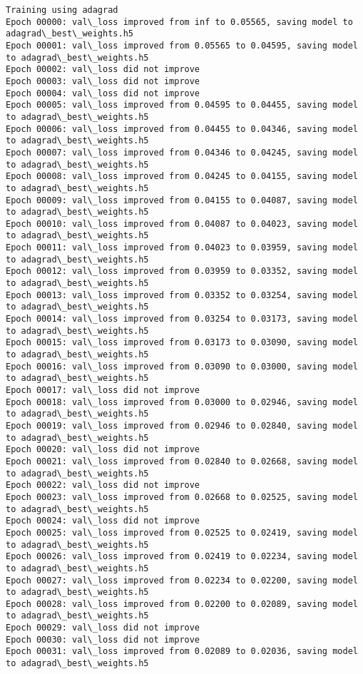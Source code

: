 \documentclass[11pt]{article}
\begin{document}
\begin{Verbatim}[commandchars=\\\{\}]
Training using adagrad
Epoch 00000: val\_loss improved from inf to 0.05565, saving model to adagrad\_best\_weights.h5
Epoch 00001: val\_loss improved from 0.05565 to 0.04595, saving model to adagrad\_best\_weights.h5
Epoch 00002: val\_loss did not improve
Epoch 00003: val\_loss did not improve
Epoch 00004: val\_loss did not improve
Epoch 00005: val\_loss improved from 0.04595 to 0.04455, saving model to adagrad\_best\_weights.h5
Epoch 00006: val\_loss improved from 0.04455 to 0.04346, saving model to adagrad\_best\_weights.h5
Epoch 00007: val\_loss improved from 0.04346 to 0.04245, saving model to adagrad\_best\_weights.h5
Epoch 00008: val\_loss improved from 0.04245 to 0.04155, saving model to adagrad\_best\_weights.h5
Epoch 00009: val\_loss improved from 0.04155 to 0.04087, saving model to adagrad\_best\_weights.h5
Epoch 00010: val\_loss improved from 0.04087 to 0.04023, saving model to adagrad\_best\_weights.h5
Epoch 00011: val\_loss improved from 0.04023 to 0.03959, saving model to adagrad\_best\_weights.h5
Epoch 00012: val\_loss improved from 0.03959 to 0.03352, saving model to adagrad\_best\_weights.h5
Epoch 00013: val\_loss improved from 0.03352 to 0.03254, saving model to adagrad\_best\_weights.h5
Epoch 00014: val\_loss improved from 0.03254 to 0.03173, saving model to adagrad\_best\_weights.h5
Epoch 00015: val\_loss improved from 0.03173 to 0.03090, saving model to adagrad\_best\_weights.h5
Epoch 00016: val\_loss improved from 0.03090 to 0.03000, saving model to adagrad\_best\_weights.h5
Epoch 00017: val\_loss did not improve
Epoch 00018: val\_loss improved from 0.03000 to 0.02946, saving model to adagrad\_best\_weights.h5
Epoch 00019: val\_loss improved from 0.02946 to 0.02840, saving model to adagrad\_best\_weights.h5
Epoch 00020: val\_loss did not improve
Epoch 00021: val\_loss improved from 0.02840 to 0.02668, saving model to adagrad\_best\_weights.h5
Epoch 00022: val\_loss did not improve
Epoch 00023: val\_loss improved from 0.02668 to 0.02525, saving model to adagrad\_best\_weights.h5
Epoch 00024: val\_loss did not improve
Epoch 00025: val\_loss improved from 0.02525 to 0.02419, saving model to adagrad\_best\_weights.h5
Epoch 00026: val\_loss improved from 0.02419 to 0.02234, saving model to adagrad\_best\_weights.h5
Epoch 00027: val\_loss improved from 0.02234 to 0.02200, saving model to adagrad\_best\_weights.h5
Epoch 00028: val\_loss improved from 0.02200 to 0.02089, saving model to adagrad\_best\_weights.h5
Epoch 00029: val\_loss did not improve
Epoch 00030: val\_loss did not improve
Epoch 00031: val\_loss improved from 0.02089 to 0.02036, saving model to adagrad\_best\_weights.h5

\end{Verbatim}
\end{document}
